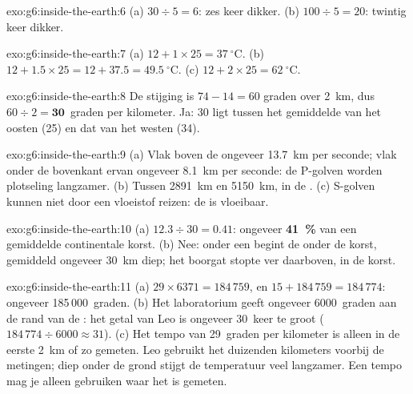 \begin{solution}{exo:g6:inside-the-earth:6}
(a) $30 \div 5 = 6$: zes keer dikker. (b) $100 \div 5 = 20$: twintig keer
dikker.
\end{solution}

\begin{solution}{exo:g6:inside-the-earth:7}
(a) $12 + 1 \times 25 = 37~^\circ$C. (b) $12 + 1.5 \times 25 = 12 + 37.5 =
49.5~^\circ$C. (c) $12 + 2 \times 25 = 62~^\circ$C.
\end{solution}

\begin{solution}{exo:g6:inside-the-earth:8}
De stijging is $74 - 14 = 60$ graden over 2~km, dus $60 \div 2 =
\textbf{30}$~graden per kilometer. Ja: 30 ligt tussen het gemiddelde van
het oosten (25) en dat van het westen (34).
\end{solution}

\begin{solution}{exo:g6:inside-the-earth:9}
(a) Vlak boven de  ongeveer 13.7~km per seconde; vlak onder de
bovenkant ervan ongeveer 8.1~km per seconde: de P-golven worden plotseling
langzamer. (b) Tussen 2891~km en 5150~km, in de . (c) S-golven
kunnen niet door een vloeistof reizen: de  is vloeibaar.
\end{solution}

\begin{solution}{exo:g6:inside-the-earth:10}
(a) $12.3 \div 30 = 0.41$: ongeveer \textbf{41~\%} van een gemiddelde
continentale korst. (b) Nee: onder een  begint de  onder
de korst, gemiddeld ongeveer 30~km diep; het boorgat stopte ver daarboven,
in de korst.
\end{solution}

\begin{solution}{exo:g6:inside-the-earth:11}
(a) $29 \times 6371 = 184\,759$, en $15 + 184\,759 = 184\,774$: ongeveer
185\,000~graden. (b) Het laboratorium geeft ongeveer 6000~graden aan de
rand van de : het getal van Leo is ongeveer 30~keer te groot
($184\,774 \div 6000 \approx 31$). (c) Het tempo van 29~graden per
kilometer is alleen in de eerste 2~km of zo gemeten. Leo gebruikt het
duizenden kilometers voorbij de metingen; diep onder de grond stijgt de
temperatuur veel langzamer. Een tempo mag je alleen gebruiken waar het is
gemeten.
\end{solution}

